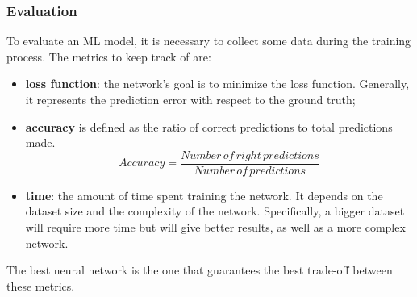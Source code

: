 \documentclass[../thesis.tex]{subfiles}
\begin{document}
\subsubsection{Evaluation}
To evaluate an ML model, it is necessary to collect some data during the training process. The metrics to keep track of are: 
\begin{itemize}
    \item \textbf{loss function}: the network's goal is to minimize the loss function. Generally, it represents the prediction error with respect to the ground truth;
    \item \textbf{accuracy} is defined as the ratio of correct predictions to total predictions made.
        \begin{equation}
                Accuracy = \frac{Number\, of\, right\, predictions}{Number\, of\, predictions}
        \end{equation}
    \item \textbf{time}: the amount of time spent training the network. It depends on the dataset size and the complexity of the network. Specifically, a bigger dataset will require more time but will give better results, as well as a more complex network. 
\end{itemize}
The best neural network is the one that guarantees the best trade-off between these metrics. 
\end{document}
